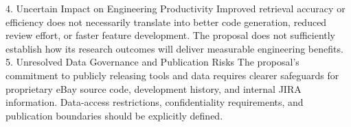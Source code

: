 4. Uncertain Impact on Engineering Productivity
Improved retrieval accuracy or efficiency does not necessarily translate into better code generation, reduced review effort, or faster feature development. The proposal does not sufficiently establish how its research outcomes will deliver measurable engineering benefits.
5. Unresolved Data Governance and Publication Risks
The proposal's commitment to publicly releasing tools and data requires clearer safeguards for proprietary eBay source code, development history, and internal JIRA information. Data-access restrictions, confidentiality requirements, and publication boundaries should be explicitly defined.
